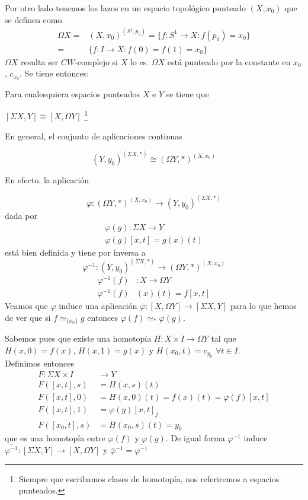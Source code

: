Por otro lado tenemos los lazos en un espacio topológico punteado $(X, x_0)$ que se definen como
\begin{align*}
\Omega X =& (X, x_0)^{(S^1, p_0)} = \{ f : S^1 \rightarrow X : f(p_0)  = x_0 \} \\ 
=& \{ f : I \rightarrow X : f(0) = f(1) = x_0 \}
\end{align*}
$\Omega X$ resulta ser $CW$-complejo si $X$ lo es. $\Omega X$ está punteado por la constante en $x_0$, $c_{x_0}$. Se tiene entonces: 
\begin{teor}
Para cualesquiera espacios punteados $X$ e  $Y$ se tiene que 
\begin{center}
$[\Sigma X, Y ] \cong [X, \Omega Y]$ \footnote{Siempre que escribamos clases de homotopía, nos referiremos a espacios punteados.}
\end{center}
\end{teor}
\begin{demo}
En general, el conjunto de aplicaciones continuas 

\[ (Y, y_0)^{(\Sigma X, \ast)} \cong (\Omega Y, \ast)^{(X, x_0)} \]

En efecto, la aplicación

\[ \varphi : (\Omega Y, \ast)^{(X, x_0)} \rightarrow (Y, y_0)^{(\Sigma X, \ast)} \]
dada por 
\begin{align*}
\varphi (g) : \Sigma X \longrightarrow Y \\
\varphi (g)[x, t] = g(x)(t)
\end{align*} 
está bien definida y tiene por inversa a 
\[ \varphi^{-1} : (Y, y_0)^{(\Sigma X, \ast)} \rightarrow (\Omega Y, \ast)^{(X, x_0)} \]
\begin{align*}
\varphi^{-1} (f)& : X \rightarrow \Omega Y \\
\varphi^{-1}(f)&(x)(t) = f[x, t]
\end{align*}
Veamos que $\varphi$ induce una aplicación $\bar{\varphi} : [X, \Omega Y] \rightarrow [\Sigma X, Y] $ para lo que hemos de ver que si $f \simeq_{\{ x_0 \}} g$ entonces $\varphi (f) \simeq_{\ast} \varphi (g)$. \par
Sabemos pues que existe una homotopía $H: X \times I \rightarrow \Omega Y$ tal que $H(x,0) = f(x) $, $H(x,1) = g(x)$ y 
$H(x_0, t) = c_{y_0}$ $\forall t \in I$.\\
Definimos entonces 
\begin{align*}
F: \Sigma X \times I &\longrightarrow Y \\
F([x,t],s) &= H(x,s)(t) \\
F([x,t],0) &= H(x,0)(t) = f(x)(t) = \varphi(f)[x,t] \\
F([x,t], 1) &= \varphi(g)[x,t]_j \\
F([x_0,t],s) &= H(x_0, s)(t) = y_0
\end{align*}
que es una homotopía entre $\varphi (f)$ y $\varphi (g)$.
De igual forma $\varphi^{-1}$ induce $\overline{\varphi^{-1}} : [\Sigma X, Y] \rightarrow [X, \Omega Y]$ y $\bar{\varphi}^{-1} = \overline{\varphi^{-1}}$\\
\end{demo}

